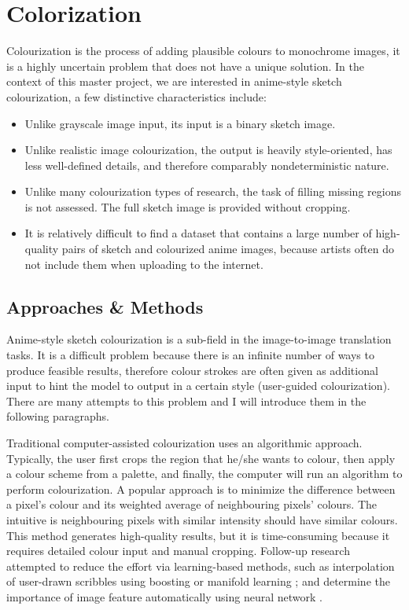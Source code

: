 \chapter{Colorization}
\label{chapterlabel3}

Colourization is the process of adding plausible colours to monochrome images, it is a highly uncertain problem that does not have a unique solution. In the context of this master project, we are interested in anime-style sketch colourization, a few distinctive characteristics include:

\begin{itemize}
    \item Unlike grayscale image input, its input is a binary sketch image.
    \item Unlike realistic image colourization, the output is heavily style-oriented, has less well-defined details, and therefore comparably nondeterministic nature.
    \item Unlike many colourization types of research, the task of filling missing regions is not assessed. The full sketch image is provided without cropping.
    \item It is relatively difficult to find a dataset that contains a large number of high-quality pairs of sketch and colourized anime images, because artists often do not include them when uploading to the internet.
\end{itemize}


\section{Approaches \& Methods}
Anime-style sketch colourization is a sub-field in the image-to-image translation tasks. It is a difficult problem because there is an infinite number of ways to produce feasible results, therefore colour strokes are often given as additional input to hint the model to output in a certain style (user-guided colourization). There are many attempts to this problem and I will introduce them in the following paragraphs.

Traditional computer-assisted colourization uses an algorithmic approach. Typically, the user first crops the region that he/she wants to colour, then apply a colour scheme from a palette, and finally, the computer will run an algorithm to perform colourization. A popular approach is to minimize the difference between a pixel's colour and its weighted average of neighbouring pixels' colours.\cite{levinColorizationUsingOptimizationb} The intuitive is neighbouring pixels with similar intensity should have similar colours. This method generates high-quality results, but it is time-consuming because it requires detailed colour input and manual cropping. Follow-up research attempted to reduce the effort via learning-based methods, such as interpolation of user-drawn scribbles using boosting \cite{liScribbleBoostAddingClassification2008} or manifold learning \cite{chenManifoldPreservingEdit2012}; and determine the importance of image feature automatically using neural network \cite{endoDeepPropExtractingDeep2016}.


